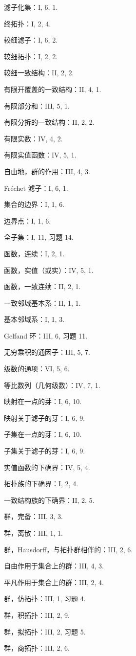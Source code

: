滤子化集：I, 6, 1.

终拓扑：I, 2, 4.

较细滤子：I, 6, 2.

较细拓扑：I, 2, 2.

较细一致结构：II, 2, 2.

有限开覆盖的一致结构：II, 4, 1.

有限部分和：III, 5, 1.

有限分拆的一致结构：II, 2, 2.

有限实数：IV, 4, 2.

有限实值函数：IV, 5, 1.

自由地，群的作用：III, 4, 3.

Fréchet 滤子：I, 6, 1.

集合的边界：I, 1, 6.

边界点：I, 1, 6.

全子集：I, 11, 习题 14.

函数，连续：I, 2, 1.

函数，实值（或实）：IV, 5, 1.

函数，一致连续：II, 2, 1.

一致邻域基本系：II, 1, 1.

基本邻域系：I, 1, 3.

Gelfand 环：III, 6, 习题 11.

无穷乘积的通因子：III, 5, 7.

级数的通项：VI, 5, 6.

等比数列（几何级数）：IV, 7, 1.

映射在一点的芽：I, 6, 10.

映射关于滤子的芽：I, 6, 9.

子集在一点的芽：I, 6, 10.

子集关于滤子的芽：I, 6, 9.

实值函数的下确界：IV, 5, 4.

拓扑族的下确界：I, 2, 4.

一致结构族的下确界：II, 2, 5.

群，完备：III, 3, 3.

群，离散：III, 1, 1.

群，Hausdorff，与拓扑群相伴的：III, 2, 6.

自由作用于集合上的群：III, 4, 3.

平凡作用于集合上的群：III, 2, 4.

群，仿拓扑：III, 1, 习题 4.

群，积拓扑：III, 2, 9.

群，拟拓扑：III, 2, 习题 5.

群，商拓扑：III, 2, 6.

